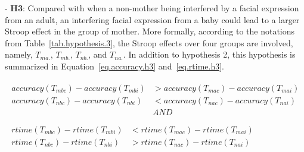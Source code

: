 \begin{table}[!t]
\centering
{}
\caption{Subsets defined for hypothesis 3.}
\label{tab.hypothesis.3}
\end{table}


\noindent - \textbf{H3}:
Compared with when a non-mother being interfered by a facial expression from an adult,
an interfering facial expression from a baby could lead to a larger Stroop effect in the group of mother.
More formally,
according to the notations from Table~\ref{tab.hypothesis.3},
the Stroop effects over four groups are involved,
namely, 
 $T_{ma.}$, $T_{mb.}$, $T_{nb.}$, and $T_{na.}$.
 In addition to hypothesis 2, this hypothesis is summarized in
 Equation~\ref{eq.accuracy.h3} and~\ref{eq.rtime.h3}.

\begin{align}
\begin{split}\label{eq.accuracy.h3}
\mathit{accuracy}(T_{mbc})-\mathit{accuracy}(T_{mbi})&>
\mathit{accuracy}(T_{mac})-\mathit{accuracy}(T_{mai})\\
\mathit{accuracy}(T_{nbc})-\mathit{accuracy}(T_{nbi})&<
\mathit{accuracy}(T_{nac})-\mathit{accuracy}(T_{nai})\\
&\mathit{AND}\\
\end{split}\\
\begin{split}\label{eq.rtime.h3}
\mathit{rtime}(T_{mbc})-\mathit{rtime}(T_{mbi})&<
\mathit{rtime}(T_{mac})-\mathit{rtime}(T_{mai})\\
\mathit{rtime}(T_{nbc})-\mathit{rtime}(T_{nbi})&>
\mathit{rtime}(T_{nac})-\mathit{rtime}(T_{nai})\\
\end{split}
\end{align}

